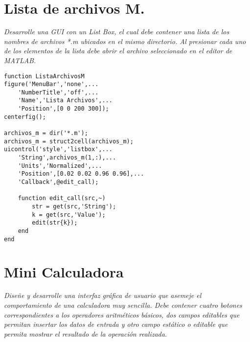 \section{Lista de archivos M.}

\textit{Desarrolle una GUI con un List Box, el cual debe contener una lista de los nombres de archivos *.m ubicados en el mismo directorio. Al presionar cada uno de los elementos de la lista debe abrir el archivo seleccionado en el editor de MATLAB.}



\begin{verbatim}
function ListaArchivosM
figure('MenuBar','none',...
    'NumberTitle','off',...
    'Name','Lista Archivos',...
    'Position',[0 0 200 300]);
centerfig();
 
archivos_m = dir('*.m');
archivos_m = struct2cell(archivos_m);
uicontrol('style','listbox',...
    'String',archivos_m(1,:),...
    'Units','Normalized',...
    'Position',[0.02 0.02 0.96 0.96],...
    'Callback',@edit_call);
 
    function edit_call(src,~)
        str = get(src,'String');
        k = get(src,'Value');
        edit(str{k});
    end
end
\end{verbatim}

\section{Mini Calculadora}

\textit{Diseñe y desarrolle una interfaz gráfica de usuario que asemeje el comportamiento de una calculadora muy sencilla. Debe contener cuatro botones correspondientes a los operadores aritméticos básicos, dos campos editables que permitan insertar los datos de entrada y otro campo estático o editable que permita mostrar el resultado de la operación realizada.}



